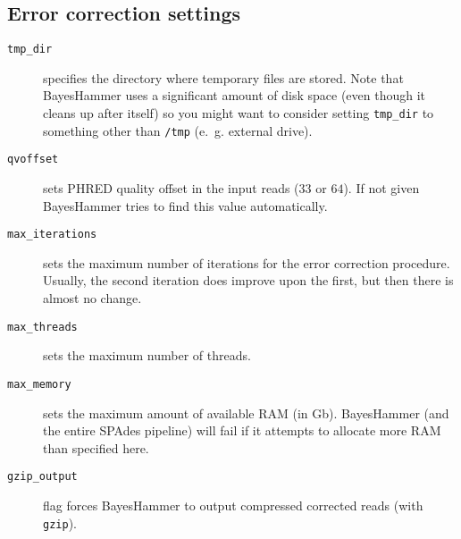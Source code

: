 \documentclass{article}
\def\spades{SPAdes}
\def\bh{BayesHammer}
\begin{document}
\subsection{Error correction settings}
\begin{description}
\item[{\tt tmp\_dir}] specifies the directory where temporary files are stored. Note that {\bh} uses a significant amount of disk space (even though it
cleans up after itself) so you might want to consider setting {\tt tmp\_dir} to something other than {\tt /tmp} (e.~g. external drive).
\item[{\tt qvoffset}] sets PHRED quality offset in the input reads ($33$ or $64$). If not given {\bh} tries to find this value automatically.
\item[{\tt max\_iterations}] sets the maximum number of iterations
for the error correction procedure. Usually, the second iteration does improve upon the first, but then there is almost no change.
\item[{\tt max\_threads}] sets the maximum number of threads.
\item[{\tt max\_memory}] sets the maximum amount of available RAM (in Gb). {\bh} (and the entire {\spades} pipeline) will fail if it attempts
to allocate more RAM than specified here.
\item[{\tt gzip\_output}] flag forces {\bh} to output compressed corrected reads (with {\tt gzip}).
\end{description}
\end{document}
